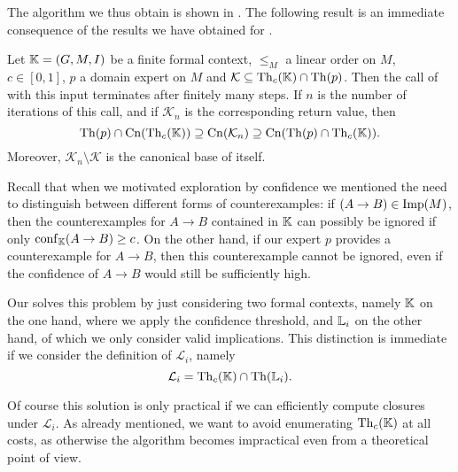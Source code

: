 The algorithm we thus obtain is shown in
.  The following result is an immediate
consequence of the results we have obtained for .

\begin{Corollary}
  \label{cor:exploration-by-confidence-first-version}
  Let ${\mathbb{K}} = (G, M, I)$ be a finite formal context, $\leq_{M}$ a linear order on $M$,
  $c \in [0,1]$, $p$ a domain expert on $M$ and $\mathcal{K} \subseteq \operatorname{Th}_{c}({\mathbb{K}})
  \cap \operatorname{Th}(p)$.  Then the call of  with
  this input terminates after finitely many steps.  If $n$ is the number of iterations of
  this call, and if $\mathcal{K}_{n}$ is the corresponding return value, then
  \begin{equation*}
    \operatorname{Th}(p) \cap \operatorname{Cn}(\operatorname{Th}_{c}({\mathbb{K}})) \supseteq \operatorname{Cn}(\mathcal{K}_{n}) \supseteq \operatorname{Cn}(\operatorname{Th}(p)
    \cap \operatorname{Th}_{c}({\mathbb{K}})).
  \end{equation*}
  Moreover, $\mathcal{K}_{n} \setminus \mathcal{K}$ is the canonical base of itself.
\end{Corollary}

Recall that when we motivated exploration by confidence we mentioned the need to
distinguish between different forms of counterexamples: if $(A \to B) \in \operatorname{Imp}(M)$, then
the counterexamples for $A \to B$ contained in ${\mathbb{K}}$ can possibly be ignored if only
$\operatorname{conf}_{{\mathbb{K}}}(A \to B) \ge c$.  On the other hand, if our expert $p$ provides a
counterexample for $A \to B$, then this counterexample cannot be ignored, even if the
confidence of $A \to B$ would still be sufficiently high.

Our  solves this problem by just
considering two formal contexts, namely ${\mathbb{K}}$ on the one hand, where we apply the
confidence threshold, and ${\mathbb{L}}_{i}$ on the other hand, of which we only consider valid
implications.  This distinction is immediate if we consider the definition of
$\mathcal{L}_{i}$, namely
\begin{equation*}
  \mathcal{L}_{i} = \operatorname{Th}_{c}({\mathbb{K}}) \cap \operatorname{Th}({\mathbb{L}}_{i}).
\end{equation*}

Of course this solution is only practical if we can efficiently compute closures under
$\mathcal{L}_{i}$.  As already mentioned, we want to avoid enumerating $\operatorname{Th}_{c}({\mathbb{K}})$
at all costs, as otherwise the algorithm becomes impractical even from a theoretical point
of view.

